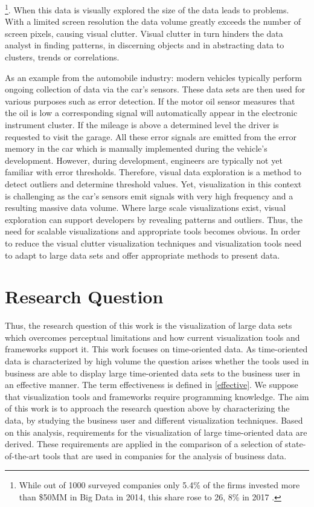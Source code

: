 \footnote{While out of 1000 surveyed companies only 5.4\% of the firms invested more than \$50MM in Big Data in 2014,  this share rose to 26, 8\% in 2017  \cite{Bean2016}.}. When this data is visually explored the size of the data leads to problems. With a limited screen resolution the data volume greatly exceeds the number of screen pixels, causing visual clutter. Visual clutter in turn hinders the data analyst in finding patterns, in discerning objects and in abstracting data to clusters, trends or correlations. 
\par
As an example from the automobile industry: modern  vehicles typically perform ongoing collection of data via the car's sensors. These data sets are then used for various purposes such as error detection. If the motor oil sensor measures that the oil is low a corresponding signal will automatically appear in the electronic instrument cluster. If the mileage is above a determined level the driver is requested to visit the garage. All these error signals are emitted from the error memory in the car which is manually implemented during the vehicle's development. However, during development, engineers are typically not yet familiar with error thresholds. Therefore, visual data exploration is a method to detect outliers and determine threshold values. Yet, visualization in this context is challenging as the car's sensors emit signals with very high frequency and a resulting massive data volume. Where large scale visualizations exist, visual exploration can support developers by revealing patterns and outliers. Thus,  the need for scalable visualizations and appropriate tools becomes obvious. 
In order to reduce the visual clutter visualization techniques and visualization tools need to adapt to large data sets and offer appropriate methods to present data.
\par

\section{Research Question}\label{research}
Thus, the research question of this work is the visualization of large data sets which overcomes perceptual limitations and how current visualization tools and frameworks support it. This work focuses on time-oriented data. 
As time-oriented data is characterized by high volume the question arises whether the tools used in business are able to display large time-oriented data sets to the business user in an effective manner. The term effectiveness is defined in \ref{effective}. 
We suppose that visualization tools and frameworks require programming knowledge.
The aim of this work is to approach the research question above by characterizing the data, by studying the business user and different visualization techniques. Based on this analysis, requirements for the visualization of large time-oriented data are derived. These requirements are applied in the comparison of a selection of state-of-the-art tools that are used in companies for the analysis of business data.

